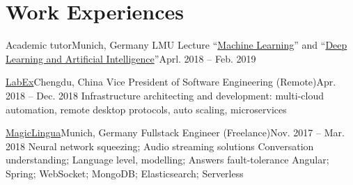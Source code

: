 \section{\textbf{Work Experiences}}
  \resumeSubHeadingListStart

    \resumeSubheading
      {Academic tutor}{Munich, Germany}
      {LMU Lecture ``\href{http://www.dbs.ifi.lmu.de/cms/studium_lehre/lehre_master/ml18/index.html}{Machine Learning}'' and ``\href{http://www.dbs.ifi.lmu.de/cms/studium_lehre/lehre_master/deep1819/index.html}{Deep Learning and Artificial Intelligence}''}{Aprl. 2018 -- Feb. 2019}
      \resumeItemListStart
      \resumeItemListEnd

    \resumeSubheading
      {\href{https://labex.io/}{LabEx}}{Chengdu, China}
      {Vice President of Software Engineering (Remote)}{Apr. 2018 -- Dec. 2018}
      \resumeItemListStart
        {
          Infrastructure architecting and development: 
          multi-cloud automation, remote desktop protocols, auto scaling, microservices
        }
      \resumeItemListEnd

    \resumeSubheading
    {\href{https://magiclingua.com/}{MagicLingua}}{Munich, Germany}
    {Fullstack Engineer (Freelance)}{Nov. 2017 -- Mar. 2018}
    \resumeItemListStart
        {Neural network squeezing; Audio streaming solutions}
        {Conversation understanding; Language level, modelling; Answers fault-tolerance}
        {Angular; Spring; WebSocket; MongoDB; Elasticsearch; Serverless}
    \resumeItemListEnd

